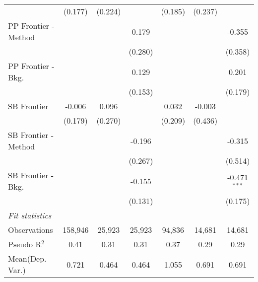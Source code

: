 \begin{tabular}{lcccccc}
                        & (0.177) & (0.224)       &               & (0.185) & (0.237)       &   \\   
   PP Frontier - Method &         &               & 0.179         &         &               & -0.355\\   
                        &         &               & (0.280)       &         &               & (0.358)\\   
   PP Frontier - Bkg.   &         &               & 0.129         &         &               & 0.201\\   
                        &         &               & (0.153)       &         &               & (0.179)\\   
   SB Frontier          & -0.006  & 0.096         &               & 0.032   & -0.003        &   \\   
                        & (0.179) & (0.270)       &               & (0.209) & (0.436)       &   \\   
   SB Frontier - Method &         &               & -0.196        &         &               & -0.315\\   
                        &         &               & (0.267)       &         &               & (0.514)\\   
   SB Frontier - Bkg.   &         &               & -0.155        &         &               & -0.471$^{***}$\\   
                        &         &               & (0.131)       &         &               & (0.175)\\   
   \midrule
   \emph{Fit statistics}\\
   Observations         & 158,946 & 25,923        & 25,923        & 94,836  & 14,681        & 14,681\\  
   Pseudo R$^2$         & 0.41    & 0.31          & 0.31          & 0.37    & 0.29          & 0.29\\  
Mean(Dep. Var.) & 0.721 & 0.464 & 0.464 & 1.055 & 0.691 & 0.691 \\
   

\end{tabular}
